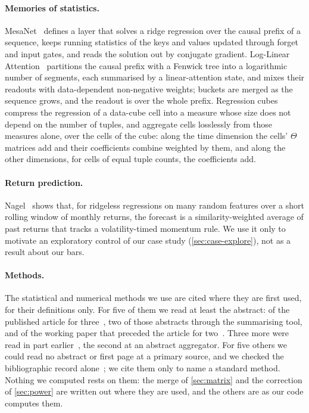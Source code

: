 \documentclass[11pt]{article}
\begin{document}
\paragraph{Memories of statistics.}
MesaNet~\cite{vonoswald2025mesanet} %
defines a layer that solves a ridge regression over the causal prefix of a sequence, keeps running
statistics of the keys and values updated through forget and input gates, and reads the solution
out by conjugate gradient. Log-Linear Attention~\cite{guo2025loglinear} %
partitions the causal prefix with a Fenwick tree into a logarithmic number of segments, each
summarised by a linear-attention state, and mixes their readouts with data-dependent non-negative
weights; buckets are merged as the sequence grows, and the readout is over the whole prefix.
Regression cubes~\cite{chen2006regcube} %
compress the regression of a data-cube cell into a measure whose size does not depend on the number
of tuples, and aggregate cells losslessly from those measures alone, over the cells of the
cube: along the time dimension the cells' $\Theta$ matrices add and their coefficients combine
weighted by them, and along the other dimensions, for cells of equal tuple counts, the coefficients add.

\paragraph{Return prediction.} Nagel~\cite{nagel2025} %
shows that, for ridgeless regressions on many random features over a short rolling window of
monthly returns, the forecast is a similarity-weighted average of past returns that tracks a
volatility-timed momentum rule. We use it only to motivate an exploratory control of our case study
(\cref{sec:case-explore}), not as a result about our bars.

\paragraph{Methods.} The statistical and numerical methods we use are cited where they are first
used, for their definitions only. For five of them we read at least the abstract: of the published
article for three~\cite{mcnemar1947,patton2009,brown1975}, two of those abstracts through the
summarising tool, and of the working paper that preceded the article for
two~\cite{diebold1995,neweywest1987}. %
Three more were read in part earlier~\cite{newcombe1998paired,politiswhite2004,katharopoulos2020},
the second at an abstract aggregator. For five others we could read no abstract or first page at a
primary source, and we checked the bibliographic record
alone~\cite{wilson1927,harvey1997,politis1994,page1954,chan1983}; we cite them only to name a
standard method. Nothing we computed rests on them: the merge of \cref{sec:matrix} and the
correction of \cref{sec:power} are written out where they are used, and the others are as our code
computes them.
\end{document}
